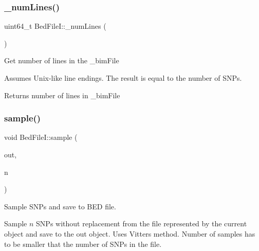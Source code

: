 \subsubsection{\texorpdfstring{\+\_\+num\+Lines()}{\_numLines()}}
{\footnotesize\ttfamily uint64\+\_\+t Bed\+File\+I\+::\+\_\+num\+Lines (\begin{DoxyParamCaption}{ }\end{DoxyParamCaption})\hspace{0.3cm}{\ttfamily [protected]}}



Get number of lines in the {\ttfamily \+\_\+bim\+File} 

Assumes Unix-\/like line endings. The result is equal to the number of S\+N\+Ps.

\begin{DoxyReturn}{Returns}
number of lines in {\ttfamily \+\_\+bim\+File} 
\end{DoxyReturn}
\mbox{\label{classsamp_files_1_1_bed_file_i_ac1050b3b8aec9108ae05285cbdfd85b3}} 
\subsubsection{\texorpdfstring{sample()}{sample()}}
{\footnotesize\ttfamily void Bed\+File\+I\+::sample (\begin{DoxyParamCaption}\item[{\hyperlink{classsamp_files_1_1_bed_file_o}{Bed\+FileO} \&}]{out,  }\item[{const uint64\+\_\+t \&}]{n }\end{DoxyParamCaption})}



Sample S\+N\+Ps and save to B\+ED file. 

Sample $n$ S\+N\+Ps without replacement from the file represented by the current object and save to the {\ttfamily out} object. Uses Vitter\textquotesingle{}s \cite{vitter87a} method. Number of samples has to be smaller that the number of S\+N\+Ps in the file.


